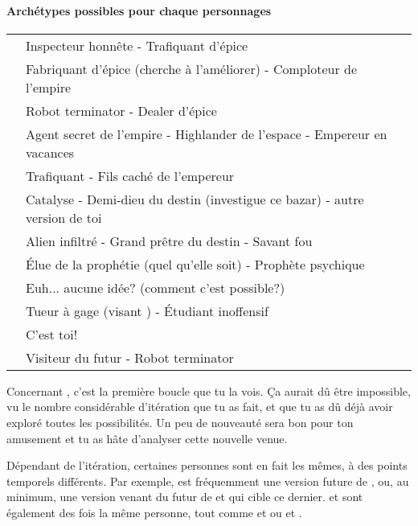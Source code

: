 {	%
	
	
	\paragraph{Archétypes possibles pour chaque personnages}
	\begin{center}
	\begin{tabular}{|l||l|}
		\hline
		\emph{\nmPlayerVII} & Inspecteur honnête - Trafiquant d'épice\\
		\emph{\nmPlayerXII} & Fabriquant d'épice (cherche à l'améliorer) - Comploteur de l'empire\\
		\emph{\nmPlayerVIII} & Robot terminator - Dealer d'épice\\
		\emph{\nmPlayerX} & Agent secret de l'empire - Highlander de l'espace - Empereur en vacances\\
		\emph{\nmPlayerII} & Trafiquant - Fils caché de l'empereur\\
		\emph{\nmPlayerXI} & Catalyse - Demi-dieu du destin (investigue ce bazar) - autre version de toi\\
		\emph{\nmPlayerI} & Alien infiltré - Grand prêtre du destin - Savant fou\\
		\emph{\nmPlayerIX} & Élue de la prophétie (quel qu'elle soit) - Prophète psychique\\
		\emph{\nmPlayerVI} & Euh... aucune idée? (comment c'est possible?)\\
		\emph{\nmPlayerIII} & Tueur à gage (visant \nmPlayerX) - Étudiant inoffensif\\
		\emph{\nmPlayerIV} & C'est toi!\\
		\emph{\nmPlayerV} & Visiteur du futur - Robot terminator\\
		\hline
	\end{tabular}
	\end{center}
	\par Concernant \nmPlayerVI, c'est la première boucle que tu la vois. Ça aurait dû être impossible, vu le nombre considérable d'itération que tu as fait, et que tu as dû déjà avoir exploré toutes les possibilités. Un peu de nouveauté sera bon pour ton amusement et tu as hâte d'analyser cette nouvelle venue.
	
	\par Dépendant de l'itération, certaines personnes sont en fait les mêmes, à des points temporels différents. Par exemple, \nmPlayerV est fréquemment une version future de \nmPlayerVII, ou, au minimum, une version venant du futur de \nmPlayerVII et qui cible ce dernier. \nmPlayerII et \nmPlayerIII sont également des fois la même personne, tout comme \nmPlayerX et \nmPlayerVIII ou \nmPlayerXII et \nmPlayerIII.
	
}
